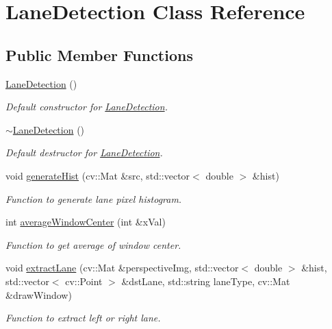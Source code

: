 \hypertarget{classLaneDetection}{}\section{Lane\+Detection Class Reference}
\label{classLaneDetection}
\subsection*{Public Member Functions}
\begin{DoxyCompactItemize}
\item 
\hyperlink{classLaneDetection_a731f54ebd16a6ad77ff51e413415d1d9}{Lane\+Detection} ()
\begin{DoxyCompactList}\small\item\em Default constructor for \hyperlink{classLaneDetection}{Lane\+Detection}. \end{DoxyCompactList}\item 
\hyperlink{classLaneDetection_afdccabf18bc0137fafb973624e8c3df3}{$\sim$\+Lane\+Detection} ()
\begin{DoxyCompactList}\small\item\em Default destructor for \hyperlink{classLaneDetection}{Lane\+Detection}. \end{DoxyCompactList}\item 
void \hyperlink{classLaneDetection_a543e9a9346892343830f0641613e330a}{generate\+Hist} (cv\+::\+Mat \&src, std\+::vector$<$ double $>$ \&hist)
\begin{DoxyCompactList}\small\item\em Function to generate lane pixel histogram. \end{DoxyCompactList}\item 
int \hyperlink{classLaneDetection_a3291cc176ecd5d81cb0e778741c7bad7}{average\+Window\+Center} (int \&x\+Val)
\begin{DoxyCompactList}\small\item\em Function to get average of window center. \end{DoxyCompactList}\item 
void \hyperlink{classLaneDetection_accd042559d371231d11544b341b2fa66}{extract\+Lane} (cv\+::\+Mat \&perspective\+Img, std\+::vector$<$ double $>$ \&hist, std\+::vector$<$ cv\+::\+Point $>$ \&dst\+Lane, std\+::string lane\+Type, cv\+::\+Mat \&draw\+Window)
\begin{DoxyCompactList}\small\item\em Function to extract left or right lane. \end{DoxyCompactList}\item 

\end{DoxyCompactItemize}
